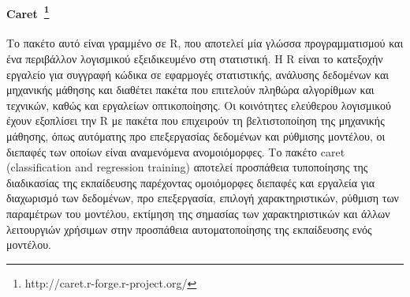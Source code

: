  \paragraph[caret]{Caret~\footnote{http://caret.r-forge.r-project.org/} }  Το πακέτο αυτό είναι γραμμένο σε R, που αποτελεί μία γλώσσα προγραμματισμού και ένα περιβάλλον λογισμικού εξειδικευμένο στη στατιστική. Η R είναι το κατεξοχήν εργαλείο για συγγραφή κώδικα σε εφαρμογές στατιστικής, ανάλυσης δεδομένων και μηχανικής μάθησης και  διαθέτει πακέτα που επιτελούν πληθώρα αλγορίθμων και τεχνικών, καθώς και εργαλείων οπτικοποίησης. Οι κοινότητες ελεύθερου λογισμικού έχουν εξοπλίσει την R με πακέτα που επιχειρούν τη βελτιστοποίηση της μηχανικής μάθησης, όπως αυτόματης προ επεξεργασίας δεδομένων και  ρύθμισης μοντέλου, οι διεπαφές των οποίων είναι αναμενόμενα ανομοιόμορφες.  Το πακέτο caret (classification and regression training) αποτελεί προσπάθεια τυποποίησης της διαδικασίας της εκπαίδευσης παρέχοντας ομοιόμορφες διεπαφές και  εργαλεία για διαχωρισμό των δεδομένων, προ επεξεργασία, επιλογή χαρακτηριστικών, ρύθμιση των παραμέτρων του μοντέλου, εκτίμηση της σημασίας των χαρακτηριστικών και άλλων λειτουργιών χρήσιμων στην προσπάθεια αυτοματοποίησης της εκπαίδευσης ενός μοντέλου.
 